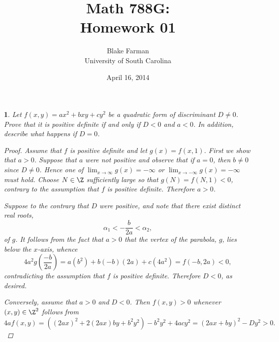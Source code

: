 \documentclass[10pt]{amsart}
\author{Blake Farman\\University of South Carolina}
\title{Math 788G:\\Homework 01}
\date{April 16, 2014}
\begin{document}
\maketitle

\providecommand{\p}{\mathfrak{p}}
\providecommand{\m}{\mathfrak{m}}
\providecommand{\Deck}[1]{\operatorname{Deck}\left(#1\right)}
\newcommand{\Res}{\operatorname{Res}}
\newtheorem{thm}{}
\newtheorem{lem}{Lemma}
\newtheorem{prop}{Proposition}
\theoremstyle{definition}
\newtheorem{defn}{Definition}[thm]

\newcommand{\A}{\mathbb{A}}

\begin{thm}\label{Ex1}
	Let $f(x,y) = ax^2 + bxy + cy^2$ be a quadratic form of discriminant $D \neq 0$.
	Prove that it is positive definite if and only if $D < 0$ and $a < 0$.
	In addition, describe what happens if $D = 0$.

	\begin{proof}
		Assume that $f$ is positive definite and let $g(x) = f(x,1)$.
		First we show that $a > 0$.
		Suppose that $a$ were not positive and observe that if $a = 0$, then $b \neq 0$ since $D \neq 0$.
		Hence one of $\lim_{x \rightarrow \infty}g(x) = -\infty$ or $\lim_{x \rightarrow -\infty}g(x) = -\infty$ must hold.
		Choose $N \in \Z$ sufficiently large so that $g(N) = f(N,1) < 0$, contrary to the assumption that $f$ is positive definite.
		Therefore $a > 0$.
		
		Suppose to the contrary that $D$ were positive, and note that there exist distinct real roots, 
		$$\alpha_1 <  -\frac{b}{2a} < \alpha_2,$$
		of $g$.
		It follows from the fact that $a > 0$ that the vertex of the parabola, $g$, lies below the $x$-axis, whence
		$$4a^2g\left(\frac{-b}{2a}\right) = a(b^2) + b(-b)(2a) + c(4a^2) = f(-b, 2a) < 0,$$
		contradicting the assumption that $f$ is positive definite.
		Therefore $D < 0$, as desired.

		Conversely, assume that $a > 0$ and $D < 0$.		
		Then $f(x,y) > 0$ whenever $(x,y) \in \Z^2$ follows from
		$$4af(x,y) = \left((2ax)^2 + 2(2ax)by + b^2y^2\right) - b^2y^2 + 4acy^2 = (2ax + by)^2 - Dy^2 > 0.$$
	\end{proof}
\end{thm}
\end{document}

